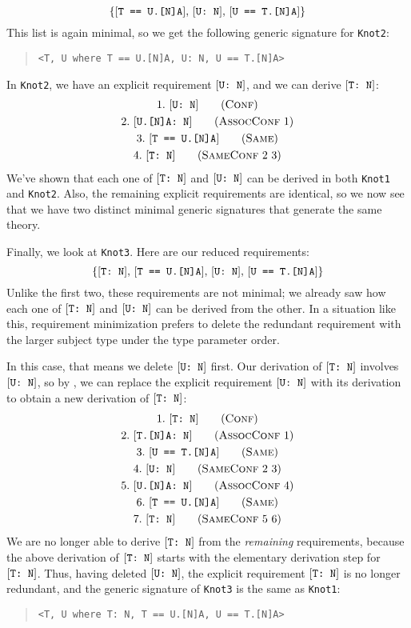 \documentclass[../generics]{subfiles}
\begin{document}
\[\{[\texttt{T == U.[N]A}],\,[\texttt{U:~N}],\,[\texttt{U == T.[N]A}]\}\]
This list is again minimal, so we get the following generic signature for \texttt{Knot2}:
\begin{quote}
\begin{verbatim}
<T, U where T == U.[N]A, U: N, U == T.[N]A>
\end{verbatim}
\end{quote}
In \texttt{Knot2}, we have an explicit requirement $[\texttt{U:~N}]$, and we can derive $[\texttt{T:~N}]$:
\begin{gather*}
\ConfStep{U}{N}{1}\\
\AssocConfStep{1}{U.[N]A}{N}{2}\\
\SameStep{T}{U.[N]A}{3}\\
\SameConfStep{2}{3}{T}{N}{4}
\end{gather*}
We've shown that each one of $[\texttt{T:~N}]$ and $[\texttt{U:~N}]$ can be derived in both \texttt{Knot1} and \texttt{Knot2}. Also, the remaining explicit requirements are identical, so we now see that we have two distinct minimal generic signatures that generate the same theory.

Finally, we look at \texttt{Knot3}. Here are our reduced requirements:
\[\{[\texttt{T:~N}],\,[\texttt{T == U.[N]A}],\,[\texttt{U:~N}],\,[\texttt{U == T.[N]A}]\}\]
Unlike the first two, these requirements are not minimal; we already saw how each one of $[\texttt{T:~N}]$ and $[\texttt{U:~N}]$ can be derived from the other. In a situation like this, requirement minimization prefers to delete the redundant requirement with the larger subject type under the type parameter order.

In this case, that means we delete $[\texttt{U:~N}]$ first. Our derivation of $[\texttt{T:~N}]$ involves $[\texttt{U:~N}]$, so by , we can replace the explicit requirement $[\texttt{U:~N}]$ with its derivation to obtain a new derivation of $[\texttt{T:~N}]$:
\begin{gather*}
\ConfStep{T}{N}{1}\\
\AssocConfStep{1}{T.[N]A}{N}{2}\\
\SameStep{U}{T.[N]A}{3}\\
\SameConfStep{2}{3}{U}{N}{4}\\
\AssocConfStep{4}{U.[N]A}{N}{5}\\
\SameStep{T}{U.[N]A}{6}\\
\SameConfStep{5}{6}{T}{N}{7}
\end{gather*}
We are no longer able to derive $[\texttt{T:~N}]$ from the \emph{remaining} requirements, because the above derivation of $[\texttt{T:~N}]$ starts with the elementary derivation step for $[\texttt{T:~N}]$. Thus, having deleted $[\texttt{U:~N}]$, the explicit requirement $[\texttt{T:~N}]$ is no longer redundant, and the generic signature of \texttt{Knot3} is the same as \texttt{Knot1}:
\begin{quote}
\begin{verbatim}
<T, U where T: N, T == U.[N]A, U == T.[N]A>
\end{verbatim}
\end{quote}
\end{document}
